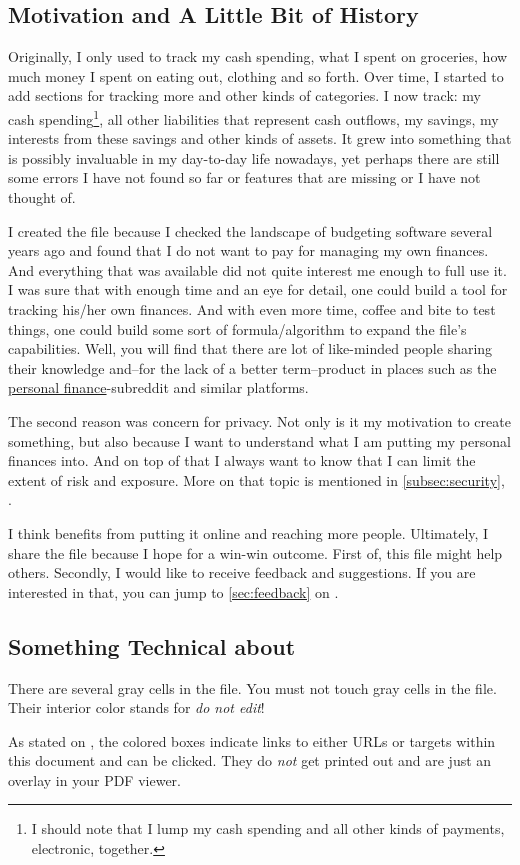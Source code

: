 \subsection{Motivation and A Little Bit of History}
\label{subsec:motivation-history}

Originally, I only used \tfn to track my cash spending, \ie what I spent on groceries, how much money I spent on eating out, clothing and so forth.
Over time, I started to add sections for tracking more and other kinds of categories.
I now track: my cash spending\footnote{I should note that I lump my cash spending and all other kinds of payments, \eg electronic, together.}, all other liabilities that represent cash outflows, my savings, my interests from these savings and other kinds of assets.
It grew into something that is possibly invaluable in my day-to-day life nowadays, yet perhaps there are still some errors I have not found so far or features that are missing or I have not thought of.

I created the file because I checked the landscape of budgeting software several years ago and found that I do not want to pay for managing my own finances.
And everything that was available did not quite interest me enough to full use it.
I was sure that with enough time and an eye for detail, one could build a tool for tracking his/her own finances.
And with even more time, coffee and bite to test things, one could build some sort of formula/algorithm to expand the file's capabilities.
Well, you will find that there are lot of like-minded people sharing their knowledge and--for the lack of a better term--product in places such as the \href{https://reddit.com/r/personalfinance}{personal finance}-subreddit and similar platforms.

The second reason was concern for privacy.
Not only is it my motivation to create something, but also because I want to understand what I am putting my personal finances into.
And on top of that I always want to know that I can limit the extent of risk and exposure.
More on that topic is mentioned in \autoref{subsec:security}, .

I think \tfn benefits from putting it online and reaching more people.
Ultimately, I share the file because I hope for a win-win outcome.
First of, this file might help others.
Secondly, I would like to receive feedback and suggestions.
If you are interested in that, you can jump to \autoref{sec:feedback} on .

\subsection{Something Technical about \tfn}
\label{subsec:introduction-something-technical}

There are several gray cells in the file.
You must not touch gray cells in the file.
Their interior color stands for \emph{do not edit}!

As stated on , the colored boxes indicate links to either URLs or targets within this document and can be clicked.
They do \emph{not} get printed out and are just an overlay in your PDF viewer.